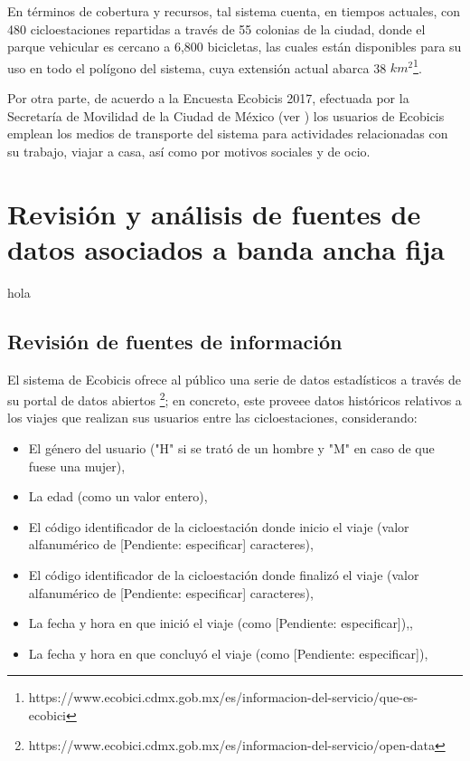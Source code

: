 \documentclass[9pt,twocolumn,twoside]{ilcss}
\begin{document}
En términos de cobertura y recursos, tal sistema cuenta, en tiempos actuales, con 480 cicloestaciones repartidas a través de 55 colonias de la ciudad, donde el parque vehicular es cercano a 6,800 bicicletas, las cuales están disponibles para su uso en todo el polígono del sistema, cuya extensión actual abarca 38 $km^2$\footnote{https://www.ecobici.cdmx.gob.mx/es/informacion-del-servicio/que-es-ecobici}.

Por otra parte, de acuerdo a la Encuesta Ecobicis 2017, efectuada por la Secretaría de Movilidad de la Ciudad de México (ver \cite{Ecobicis2017}) los usuarios de Ecobicis emplean los medios de transporte del sistema para actividades relacionadas con su trabajo, viajar a casa, así como por motivos sociales y de ocio.

\section{Revisión y análisis de fuentes de datos asociados a banda ancha fija}

hola

\subsection{Revisión de fuentes de información}

El sistema de Ecobicis ofrece al público una serie de datos estadísticos a través de su portal de datos abiertos \footnote{https://www.ecobici.cdmx.gob.mx/es/informacion-del-servicio/open-data}; en concreto, este proveee datos históricos relativos a los viajes que realizan sus usuarios entre las cicloestaciones, considerando:
\begin{itemize}
	\item El género del usuario ("H" si se trató de un hombre y "M" en caso de que fuese una mujer), \vspace{-0.2cm}
	\item La edad (como un valor entero),\vspace{-0.2cm}
	\item El código identificador de la cicloestación donde inicio el viaje (valor alfanumérico de [Pendiente: especificar] caracteres),\vspace{-0.2cm}
	\item El código identificador de la cicloestación donde finalizó el viaje (valor alfanumérico de [Pendiente: especificar] caracteres),\vspace{-0.2cm}
	\item La fecha y hora en que inició el viaje (como [Pendiente: especificar]),\vspace{-0.2cm},
	\item La fecha y hora en que concluyó el viaje (como [Pendiente: especificar]),\vspace{-0.2cm}
	
\end{itemize}
\end{document}

